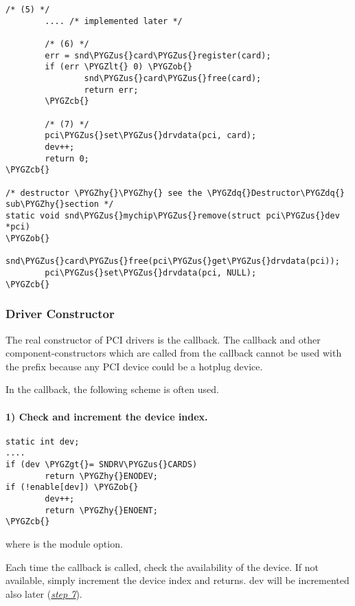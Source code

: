 \documentclass[a4paper,8pt,english]{sphinxmanual}
\def\PYGZus{\char`\_}
\def\PYGZob{\char`\{}
\def\PYGZcb{\char`\}}
\def\PYGZlt{\char`\<}
\def\PYGZgt{\char`\>}
\def\PYGZhy{\char`\-}
\def\PYGZdq{\char`\"}
\begin{document}
\begin{Verbatim}[commandchars=\\\{\}]
        /* (5) */
        .... /* implemented later */

        /* (6) */
        err = snd\PYGZus{}card\PYGZus{}register(card);
        if (err \PYGZlt{} 0) \PYGZob{}
                snd\PYGZus{}card\PYGZus{}free(card);
                return err;
        \PYGZcb{}

        /* (7) */
        pci\PYGZus{}set\PYGZus{}drvdata(pci, card);
        dev++;
        return 0;
\PYGZcb{}

/* destructor \PYGZhy{}\PYGZhy{} see the \PYGZdq{}Destructor\PYGZdq{} sub\PYGZhy{}section */
static void snd\PYGZus{}mychip\PYGZus{}remove(struct pci\PYGZus{}dev *pci)
\PYGZob{}
        snd\PYGZus{}card\PYGZus{}free(pci\PYGZus{}get\PYGZus{}drvdata(pci));
        pci\PYGZus{}set\PYGZus{}drvdata(pci, NULL);
\PYGZcb{}
\end{Verbatim}


\subsubsection{Driver Constructor}
\label{sound/kernel-api/writing-an-alsa-driver:driver-constructor}
The real constructor of PCI drivers is the  callback. The
 callback and other component-constructors which are called
from the  callback cannot be used with the  prefix
because any PCI device could be a hotplug device.

In the  callback, the following scheme is often used.


\paragraph{1) Check and increment the device index.}
\label{sound/kernel-api/writing-an-alsa-driver:check-and-increment-the-device-index}
\begin{Verbatim}[commandchars=\\\{\}]
static int dev;
....
if (dev \PYGZgt{}= SNDRV\PYGZus{}CARDS)
        return \PYGZhy{}ENODEV;
if (!enable[dev]) \PYGZob{}
        dev++;
        return \PYGZhy{}ENOENT;
\PYGZcb{}
\end{Verbatim}

where  is the module option.

Each time the  callback is called, check the availability of
the device. If not available, simply increment the device index and
returns. dev will be incremented also later ({\hyperref[sound/kernel\string-api/writing\string-an\string-alsa\string-driver:set\string-the\string-pci\string-driver\string-data\string-and\string-return\string-zero]{\emph{step 7}}}).
\end{document}
